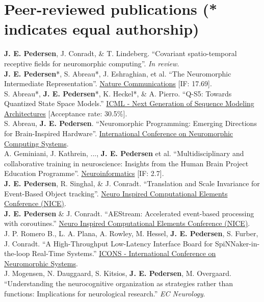 \documentclass[11pt, a4paper]{article}
\newcommand{\years}[1]{\marginnote{\scriptsize #1}}
\begin{document}
\section*{Peer-reviewed publications {\small (* indicates equal authorship)}}
\years{2025}\textbf{J. E. Pedersen}, J. Conradt, \& T. Lindeberg. ``Covariant spatio-temporal receptive fields for neuromorphic computing''. \emph{In review}. \\
\years{2024}\textbf{J. E. Pedersen}*, S. Abreau*, J. Eshraghian, et al. ``The Neuromorphic Intermediate Representation''.
\href{https://www.nature.com/ncomms/}{Nature Communications} [IF: 17.69]. \\
\years{2024} S. Abreau*, \textbf{J. E. Pedersen}*, K. Heckel*, \& A. Pierro. ``Q-S5: Towards Quantized State Space Models.''
\href{https://icml.cc/virtual/2024/workshop/29962}{ICML - Next Generation of Sequence Modeling Architectures} [Acceptance rate: 30.5\%]. \\
\years{2024} S. Abreau, \textbf{J. E. Pedersen}.
``Neuromorphic Programming: Emerging Directions for Brain-Inspired Hardware''.
\href{https://iconsneuromorphic.cc/}{International Conference on Neuromorphic Computing Systems}. \\
\years{2024} A. Geminiani, J. Kathrein, ..., \textbf{J. E. Pedersen} et al. ``Multidisciplinary and collaborative training in neuroscience: Insights from the Human Brain Project Education Programme''. \href{https://link.springer.com/journal/12021}{Neuroinformatics} [IF: 2.7]. \\
\years{2023} \textbf{J. E. Pedersen}, R. Singhal, \& J. Conradt.
``Translation and Scale Invariance for Event-Based Object tracking''.
\href{https://niceworkshop.org/}{Neuro Inspired Computational Elements Conference (NICE)}. \\
\years{2023} \textbf{J. E. Pedersen} \& J. Conradt.
``AEStream: Accelerated event-based processing with coroutines.''
\href{https://niceworkshop.org/}{Neuro Inspired Computational Elements Conference (NICE)}. \\
\years{2023} J. P. Romero B., L. A. Plana, A. Rowley, M. Hessel, \textbf{J. E. Pedersen}, S. Furber, J. Conradt.
``A High-Throughput Low-Latency Interface Board for SpiNNaker-in-the-loop Real-Time Systems.''
\href{https://icons.ornl.gov/}{ICONS - International Conference on Neuromorphic Systems}. \\
\years{2018} J. Mogensen, N. Dauggaard, S. Kitsios, \textbf{J. E. Pedersen}, M. Overgaard.
``Understanding the neurocognitive organization as strategies rather than functions: Implications for neurological research.''
\emph{EC Neurology}.
\end{document}
